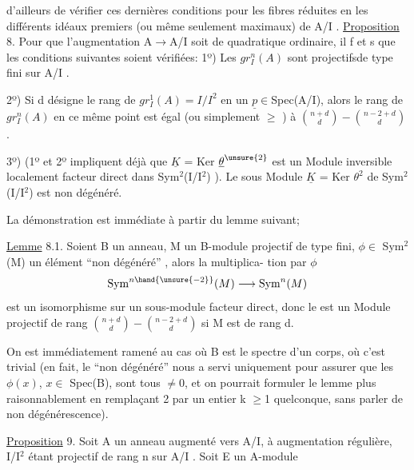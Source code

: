 d'ailleurs de vérifier ces dernières conditions pour les fibres réduites
en les différents idéaux premiers (ou même seulement maximaux) de A/I .
\uline{Proposition} 8. Pour que l'augmentation A$\rightarrow$A/I soit de  quadratique
ordinaire, il f et s que les conditions suivantes soient vérifiées:
1º)   Les $gr^{n}_{I}(A)$ sont projectifsde type fini sur A/I .

2º) Si d désigne le rang de $gr^{1}_{I}(A) = I/I^{2}$ en un $\underline{p} \in$Spec(A/I),
alors le rang de $gr^{n}_{I}(A)$ en ce même point est égal (ou simplement
$\geqslant$ ) à $\binom{n+d}{d} - \binom{n-2+d}{d}$ .

3º) (1º et 2º impliquent déjà que $\underline{K}$ = Ker $\underline{\theta}^{\unsure{2}}$ est un Module
inversible localement facteur direct dans  Sym$^{2}$(I/I$^{2}$) ). Le sous
Module $\underline{K}$ = Ker $\theta^{2}$ de Sym$^{2}$(I/I$^{2}$) est non dégénéré.

La démonstration est immédiate à partir du lemme suivant; 

 \uline{Lemme} 8.1. Soient B un anneau, M un B-module projectif de
type fini, $\phi \in$ Sym$^{2}$(M) un élément ``non dégénéré'' , alors la multiplica-%
tion par $\phi$
\[ \mathrm{Sym}^{n\hand{\unsure{-2}}}(M) \longrightarrow \mathrm{Sym}^{n}(M) \]
est un isomorphisme sur un sous-module facteur direct, donc le 
est un Module projectif de rang $\binom{n+d}{d} - \binom{n-2+d}{d}$ si M est de rang d.

On est immédiatement ramené au cas où B est le spectre d'un corps,
où c'est trivial (en fait, le ``non dégénéré'' nous a servi uniquement
\placedmargin{||} pour assurer que les $\phi(x)$, $x \in$ Spec(B), sont tous $\neq 0$, et on pourrait
formuler le lemme plus raisonnablement en remplaçant 2 par un entier
k $\geqslant$1 quelconque, sans parler de non dégénérescence).

\uline{Proposition} 9. Soit A un anneau augmenté vers A/I, à augmentation
régulière, I/I$^{2}$ étant projectif de rang n sur A/I . Soit E un A-module

